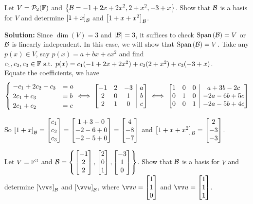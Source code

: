 \begin{example}
    Let $V = \mathcal{P}_2({\mathbb{F}})$ and $\left\{ \mathcal{B} = -1+2x+2x^2,2+x^2,-3+x \right\}$.
    Show that $\mathcal{B}$ is a basis for $V$ and determine $\left[ 1+x \right]_{\mathcal{B}}$ and $\left[ 1+x+x^2 \right]_{\mathcal{B}}$.

    \textbf{Solution: } Since $\dim{(V)} = 3$ and $|\mathcal{B}| = 3$, it suffices to check $\operatorname{Span}{(\mathcal{B})} = V$ or $\mathcal{B}$ is linearly independent.
    In this case, we will show that $\operatorname{Span}{(\mathcal{B})} = V$. Take any $p(x) \in V$, say $p(x) = a+bx+cx^2$ and find $c_1,c_2,c_3 \in {\mathbb{F}} \text{ s.t. } p(x) = c_1(-1+2x+2x^2) + c_2(2+x^2) +c_3(-3+x)$. \\
    Equate the coefficients, we have \vspace{-2mm}
    \[\begin{cases}
        \; -c_1 + 2c_2 - c_3  & = a \\ 
        \; 2c_1 + c_3  & = b \\
        \; 2c_1 + c_2  &= c
      \end{cases}
      \iff
      \left[
        \begin{array}{@{}ccc|c@{}}
            -1 & 2 & -3 & a \\
            2 & 0 & 1 & b \\
            2 & 1 & 0 & c
        \end{array}
      \right] \iff
      \left[
        \begin{array}{@{}ccc|c@{}}
            1 & 0 & 0 & a+3b-2c \\
            0 & 1 & 0 & -2a-6b+5c \\
            0 & 0 & 1 & -2a-5b+4c
        \end{array}
      \right]
    \]
    \vspace{-5mm}
    
    So $\left[ 1+x \right]_{\mathcal{B}} = \begin{bmatrix} c_1 \\ c_2 \\ c_3 \end{bmatrix} = \begin{bmatrix} 1+3-0 \\ -2-6+0 \\ -2-5+0 \end{bmatrix} = \begin{bmatrix} 4 \\ -8 \\ -7 \end{bmatrix}$
    and $\left[ 1+x+x^2 \right]_{\mathcal{B}} = \begin{bmatrix} 2 \\ -3 \\ -3 \end{bmatrix}$.
\end{example}

\begin{example}
    Let $V = {\mathbb{F}}^3$ and $\mathcal{B} = \left\{ \begin{bmatrix} -1 \\ 2 \\2 \end{bmatrix}, \begin{bmatrix} 2 \\ 0 \\ 1 \end{bmatrix}, \begin{bmatrix} -3 \\ 1 \\ 0 \end{bmatrix} \right\}$.
    Show that $\mathcal{B}$ is a basis for $V$ and determine $\left[\vvv \right]_{\mB}$ and $\left[ \vvu \right]_{\mB}$, where $\vvv = \cv{1 \\ 1 \\ 0}$ and $\vvu = \cv{1 \\ 1 \\ 1}$.
\end{example}

